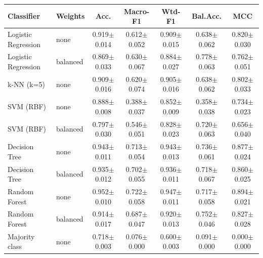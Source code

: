 \begin{tabular}{llccccc}
\toprule
Classifier & Weights & Acc. & Macro-F1 & Wtd-F1 & Bal.Acc. & MCC \\
\midrule
Logistic Regression & none & 0.919$\pm$0.014 & 0.612$\pm$0.052 & 0.909$\pm$0.015 & 0.638$\pm$0.062 & 0.820$\pm$0.030 \\
Logistic Regression & balanced & 0.869$\pm$0.033 & 0.630$\pm$0.067 & 0.884$\pm$0.027 & 0.778$\pm$0.063 & 0.762$\pm$0.051 \\
k-NN (k=5) & none & 0.909$\pm$0.016 & 0.620$\pm$0.074 & 0.905$\pm$0.016 & 0.638$\pm$0.062 & 0.802$\pm$0.033 \\
SVM (RBF) & none & 0.888$\pm$0.008 & 0.388$\pm$0.037 & 0.852$\pm$0.009 & 0.358$\pm$0.038 & 0.734$\pm$0.023 \\
SVM (RBF) & balanced & 0.797$\pm$0.030 & 0.546$\pm$0.051 & 0.828$\pm$0.023 & 0.720$\pm$0.063 & 0.656$\pm$0.040 \\
Decision Tree & none & 0.943$\pm$0.011 & 0.713$\pm$0.054 & 0.943$\pm$0.013 & 0.736$\pm$0.061 & 0.877$\pm$0.024 \\
Decision Tree & balanced & 0.935$\pm$0.012 & 0.702$\pm$0.055 & 0.936$\pm$0.011 & 0.718$\pm$0.067 & 0.860$\pm$0.025 \\
Random Forest & none & 0.952$\pm$0.010 & 0.722$\pm$0.058 & 0.947$\pm$0.011 & 0.717$\pm$0.058 & 0.894$\pm$0.021 \\
Random Forest & balanced & 0.914$\pm$0.017 & 0.687$\pm$0.047 & 0.920$\pm$0.013 & 0.752$\pm$0.046 & 0.827$\pm$0.028 \\
Majority class & none & 0.718$\pm$0.003 & 0.076$\pm$0.000 & 0.600$\pm$0.003 & 0.091$\pm$0.000 & 0.000$\pm$0.000 \\
\bottomrule
\end{tabular}
